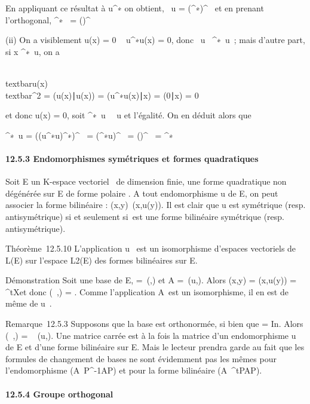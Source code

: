 En appliquant ce résultat à u^∗ on obtient,
\mathrmKer~u =
(\mathrmImu^∗)^\bot~
et en prenant l'orthogonal,
\mathrmImu^∗~ =
(\mathrmKeru)^\bot~

(ii) On a visiblement u(x) = 0 \rigtharrow~ u^∗u(x) = 0, donc
\mathrmKer~u
\subset~\mathrmKeru^∗~u~;
mais d'autre part, si x
\in\mathrmKeru^∗~u,
on a

\\textbar{}u(x)\\textbar{}^2 =
(u(x)∣u(x)) =
(u^∗u(x)∣x) =
(0∣x) = 0

et donc u(x) = 0, soit
\mathrmKeru^∗~u
\subset~\mathrmKer~u et l'égalité.
On en déduit alors que

\mathrmImu^∗~u =
(\mathrmKer(u^∗u)^∗)^\bot~
=
(\mathrmKeru^∗u)^\bot~
=
(\mathrmKeru)^\bot~
= \mathrmImu^∗~

\paragraph{12.5.3 Endomorphismes symétriques et formes quadratiques}

Soit E un K-espace vectoriel ~de dimension finie, \Phi une forme
quadratique non dégénérée sur E de forme polaire \phi. A tout endomorphisme
u de E, on peut associer la forme bilinéaire \psiu :
(x,y)\mapsto~\phi(x,u(y)). Il est clair que u est
symétrique (resp. antisymétrique) si et seulement si~\psiu est
une forme bilinéaire symétrique (resp. antisymétrique).

Théorème~12.5.10 L'application u\mapsto~\psiu
est un isomorphisme d'espaces vectoriels de L(E) sur l'espace
L2(E) des formes bilinéaires sur E.

Démonstration Soit  une base de E, \Omega =\
\mathrmMat (\phi,) et A =\
\mathrmMat (u,). Alors \psiu(x,y) =
\phi(x,u(y)) = ^tX\OmegaAY et donc
\mathrmMat (\psiu~,\mathcal{E})
= \OmegaA. Comme l'application A\mapsto~\OmegaA est un
isomorphisme, il en est de même de
u\mapsto~\psiu.

Remarque~12.5.3 Supposons que la base  est orthonormée, si bien que \Omega =
In. Alors
\mathrmMat (\psiu~,)
= \mathrmMat~ (u,\mathcal{E}). Une
matrice carrée est à la fois la matrice d'un endomorphisme u de E et
d'une forme bilinéaire \psiu sur E. Mais le lecteur prendra garde
au fait que les formules de changement de bases ne sont évidemment pas
les mêmes pour l'endomorphisme
(A\mapsto~P^-1AP) et pour la forme
bilinéaire (A\mapsto~^tPAP).

\paragraph{12.5.4 Groupe orthogonal}

